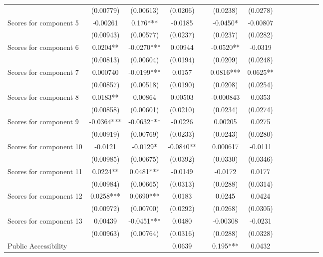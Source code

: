\documentclass[]{article}
\begin{document}
\begin{tabular}{lcccccccccccc}
 & (0.00779) & (0.00613) & (0.0206) &  & (0.0238) & (0.0278) &  &  &  &  &  &  \\
Scores for component 5 & -0.00261 & 0.176*** & -0.0185 &  & -0.0450* & -0.00807 &  &  &  &  &  &  \\
 & (0.00943) & (0.00577) & (0.0237) &  & (0.0237) & (0.0282) &  &  &  &  &  &  \\
Scores for component 6 & 0.0204** & -0.0270*** & 0.00944 &  & -0.0520** & -0.0319 &  &  &  &  &  &  \\
 & (0.00813) & (0.00604) & (0.0194) &  & (0.0209) & (0.0248) &  &  &  &  &  &  \\
Scores for component 7 & 0.000740 & -0.0199*** & 0.0157 &  & 0.0816*** & 0.0625** &  &  &  &  &  &  \\
 & (0.00857) & (0.00518) & (0.0190) &  & (0.0208) & (0.0254) &  &  &  &  &  &  \\
Scores for component 8 & 0.0183** & 0.00864 & 0.00503 &  & -0.000843 & 0.0353 &  &  &  &  &  &  \\
 & (0.00858) & (0.00601) & (0.0210) &  & (0.0234) & (0.0274) &  &  &  &  &  &  \\
Scores for component 9 & -0.0364*** & -0.0632*** & -0.0226 &  & 0.00205 & 0.0275 &  &  &  &  &  &  \\
 & (0.00919) & (0.00769) & (0.0233) &  & (0.0243) & (0.0280) &  &  &  &  &  &  \\
Scores for component 10 & -0.0121 & -0.0129* & -0.0840** &  & 0.000617 & -0.0111 &  &  &  &  &  &  \\
 & (0.00985) & (0.00675) & (0.0392) &  & (0.0330) & (0.0346) &  &  &  &  &  &  \\
Scores for component 11 & 0.0224** & 0.0481*** & -0.0149 &  & -0.0172 & 0.0177 &  &  &  &  &  &  \\
 & (0.00984) & (0.00665) & (0.0313) &  & (0.0288) & (0.0314) &  &  &  &  &  &  \\
Scores for component 12 & 0.0258*** & 0.0690*** & 0.0183 &  & 0.0245 & 0.0424 &  &  &  &  &  &  \\
 & (0.00972) & (0.00700) & (0.0292) &  & (0.0268) & (0.0305) &  &  &  &  &  &  \\
Scores for component 13 & 0.00439 & -0.0451*** & 0.0480 &  & -0.00308 & -0.0231 &  &  &  &  &  &  \\
 & (0.00963) & (0.00764) & (0.0316) &  & (0.0288) & (0.0328) &  &  &  &  &  &  \\
Public Accessibility &  &  & 0.0639 &  & 0.195*** & 0.0432 &  &  &  &  &  &  \\

\end{tabular}
\end{document}
